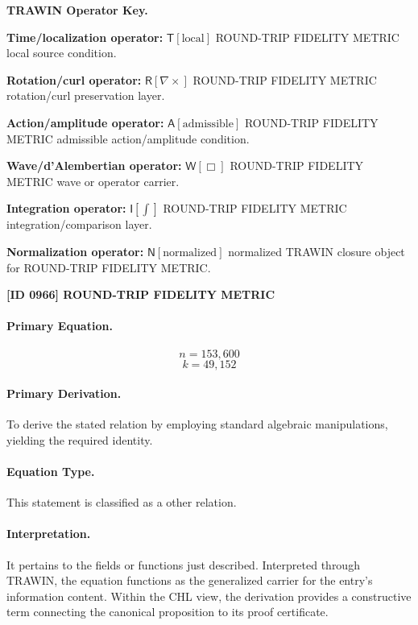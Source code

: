 \par\vspace{0.45\baselineskip}
\noindent\begin{minipage}[t]{\linewidth}
\begingroup
\small
\raggedright
\textbf{TRAWIN Operator Key.}\par
\noindent\textbf{Time/localization operator:} $\mathsf{T}\!\left[\mathrm{local}\right]$ ROUND-TRIP FIDELITY METRIC local source condition.\par
\noindent\textbf{Rotation/curl operator:} $\mathsf{R}\!\left[\nabla\times\right]$ ROUND-TRIP FIDELITY METRIC rotation/curl preservation layer.\par
\noindent\textbf{Action/amplitude operator:} $\mathsf{A}\!\left[\mathrm{admissible}\right]$ ROUND-TRIP FIDELITY METRIC admissible action/amplitude condition.\par
\noindent\textbf{Wave/d'Alembertian operator:} $\mathsf{W}\!\left[\Box\right]$ ROUND-TRIP FIDELITY METRIC wave or operator carrier.\par
\noindent\textbf{Integration operator:} $\mathsf{I}\!\left[\int\right]$ ROUND-TRIP FIDELITY METRIC integration/comparison layer.\par
\noindent\textbf{Normalization operator:} $\mathsf{N}\!\left[\mathrm{normalized}\right]$ normalized TRAWIN closure object for ROUND-TRIP FIDELITY METRIC.\par
\endgroup
\end{minipage}

\clearpage
\noindent\textbf{[ID 0966] ROUND-TRIP FIDELITY METRIC}\par
\vspace{0.35em}
\paragraph{Primary Equation.}
\[
n=153,600
\]
\[
k=49,152
\]

\paragraph{Primary Derivation.}
To derive the stated relation by employing standard algebraic manipulations, yielding the required identity.
\paragraph{Equation Type.}
This statement is classified as a other relation.

\paragraph{Interpretation.}
It pertains to the fields or functions just described. Interpreted through TRAWIN, the equation functions as the generalized carrier for the entry’s information content. Within the CHL view, the derivation provides a constructive term connecting the canonical proposition to its proof certificate.

